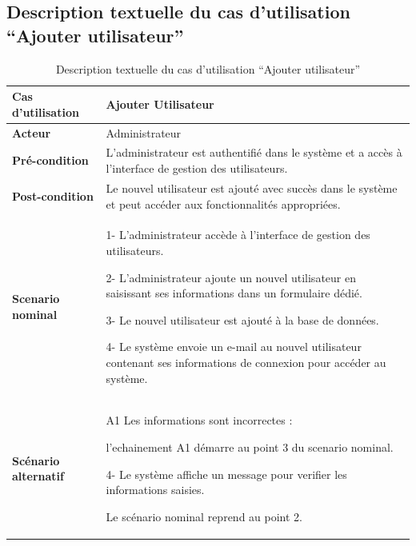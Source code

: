 \newpage
\subsection{Description textuelle du cas d’utilisation “Ajouter utilisateur”}
\begin{table}[htbp]
  \centering
  \renewcommand{\arraystretch}{1.5} %
  \begin{tabular}{|p{4cm}|p{9cm}|}
    \hline
    \textbf{Cas d'utilisation}   & Ajouter Utilisateur                                                                                           \\
    \hline
    \textbf{Acteur}              & Administrateur                                                                                                \\
    \hline
    \textbf{Pré-condition}       & L'administrateur est authentifié dans le système et a accès à l'interface de gestion des utilisateurs.        \\
    \hline
    \textbf{Post-condition}      & Le nouvel utilisateur est ajouté avec succès dans le système et peut accéder aux fonctionnalités appropriées. \\
    \hline
    \textbf{Scenario nominal}    & 1- L'administrateur accède à l'interface de gestion des utilisateurs.\newline

    2- L'administrateur ajoute un nouvel utilisateur en saisissant ses informations dans un formulaire dédié.\newline



    3- Le nouvel utilisateur est ajouté à la base de données.\newline

    4- Le système envoie un e-mail au nouvel utilisateur contenant ses informations de connexion pour accéder au système.                        \\
    \hline
    \textbf{Scénario alternatif} & A1 Les informations sont incorrectes : \newline

    l'echainement A1 démarre au point 3 du scenario nominal. \newline

    4- Le système affiche un message pour verifier les informations saisies.\newline

    Le scénario nominal reprend au point 2.                                                                                                      \\

    \hline
  \end{tabular}
  \caption{Description textuelle du cas d’utilisation “Ajouter utilisateur”}



\end{table}
\newpage
